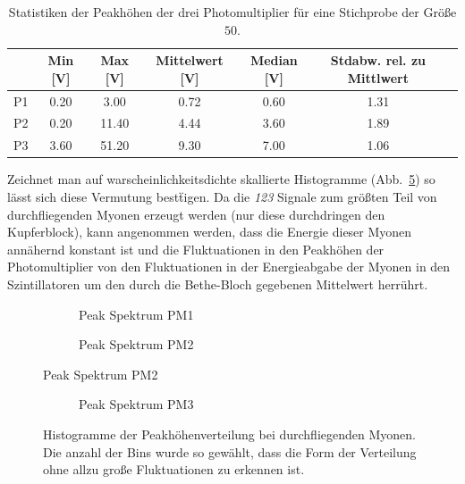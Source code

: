 \documentclass[slug=LM, room=Andreas-Schubert-Bau\,\ K\ 1A, supervisor=Anne-Sophie\ Berthold, coursedate=13.\ 12.\ 2019]{../../Lab_Report_LaTeX/lab_report}
\begin{document}
\begin{table}[h]
  \centering
  \begin{tabular}{l|S|S|S|S|S|S}
    \toprule
    & {Min [\si{\volt}]} & {Max [\si{\volt}]} & {Mittelwert
                                                [\si{\volt}]} &
                                                                {Median
                                                                [\si{\volt}]}
    & {Stdabw. rel. zu Mittlwert}\\
    \midrule
    P1 & 0.20 & 3.00 & 0.72 & 0.60 & 1.31 \\
    P2 & 0.20 & 11.40 & 4.44 & 3.60 & 1.89 \\
    P3 & 3.60 & 51.20 & 9.30 & 7.00 & 1.06 \\
  \end{tabular}
  \caption{Statistiken der Peakh\"ohen der drei Photomultiplier f\"ur
    eine Stichprobe der Gr\"o\ss{}e \(50\).}
  \label{tab:statpeaks}
\end{table}

Zeichnet man auf warscheinlichkeitsdichte skallierte Histogramme
(Abb.~\ref{fig:histos}) so l\"asst sich diese Vermutung best\"tigen.
Da die \textit{123} Signale zum gr\"o\ss{}ten Teil von durchfliegenden
Myonen erzeugt werden (nur diese durchdringen den Kupferblock), kann
angenommen werden, dass die Energie dieser Myonen ann\"ahernd konstant
ist und die Fluktuationen in den Peakh\"ohen der Photomultiplier von
den Fluktuationen in der Energieabgabe der Myonen in den
Szintillatoren um den durch die Bethe-Bloch gegebenen Mittelwert
herr\"uhrt.

\begin{figure}[h]
  \begin{subfigure}{\textwidth}
    \centering
    
    \caption{Peak Spektrum PM1}
    \label{fig:vorversuch-muon_P1_spec}
  \end{subfigure}

  \begin{subfigure}{\textwidth}
    \centering
    
    \caption{Peak Spektrum PM2}
    \label{fig:vorversuch-muon_P2_spec}
  \end{subfigure}
\end{figure}

\begin{figure}[h]
  \ContinuedFloat
  \centering
  \begin{subfigure}{\textwidth}
    \centering
    
    \caption{Peak Spektrum PM3}
    \label{fig:vorversuch-muon_P3_spec}
  \end{subfigure}

  \caption[Peak Histogramme PM1-3]{Histogramme der
    Peakh\"ohenverteilung bei durchfliegenden Myonen. Die anzahl der
    Bins wurde so gew\"ahlt, dass die Form der Verteilung ohne allzu
    gro\ss{}e Fluktuationen zu erkennen ist.}
  \label{fig:histos}
\end{figure}
\end{document}
